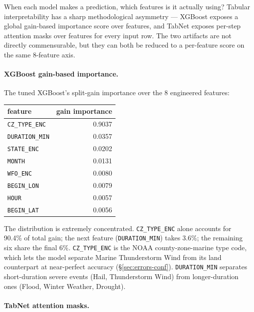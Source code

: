 \documentclass[11pt]{article}
\begin{document}
When each model makes a prediction, which features is it actually
using? Tabular interpretability has a sharp methodological
asymmetry --- XGBoost exposes a global gain-based importance score
over features, and TabNet exposes per-step attention masks over
features for every input row. The two artifacts are not directly
commensurable, but they can both be reduced to a per-feature score
on the same 8-feature axis.

\paragraph{XGBoost gain-based importance.}

The tuned XGBoost's split-gain importance over the 8 engineered
features:

\begin{center}
\small
\begin{tabular}{lr}
\toprule
feature & gain importance \\
\midrule
\texttt{CZ\_TYPE\_ENC}  & 0.9037 \\
\texttt{DURATION\_MIN}  & 0.0357 \\
\texttt{STATE\_ENC}     & 0.0202 \\
\texttt{MONTH}          & 0.0131 \\
\texttt{WFO\_ENC}       & 0.0080 \\
\texttt{BEGIN\_LON}     & 0.0079 \\
\texttt{HOUR}           & 0.0057 \\
\texttt{BEGIN\_LAT}     & 0.0056 \\
\bottomrule
\end{tabular}
\end{center}

The distribution is extremely concentrated. \texttt{CZ\_TYPE\_ENC}
alone accounts for 90.4\% of total gain; the next feature
(\texttt{DURATION\_MIN}) takes 3.6\%; the remaining six share the
final 6\%. \texttt{CZ\_TYPE\_ENC} is the NOAA county-zone-marine
type code, which lets the model separate Marine Thunderstorm Wind
from its land counterpart at near-perfect accuracy
(\S\ref{sec:errors-conf}). \texttt{DURATION\_MIN} separates
short-duration severe events (Hail, Thunderstorm Wind) from
longer-duration ones (Flood, Winter Weather, Drought).

\paragraph{TabNet attention masks.}\label{sec:interp-tabnet}
\end{document}
